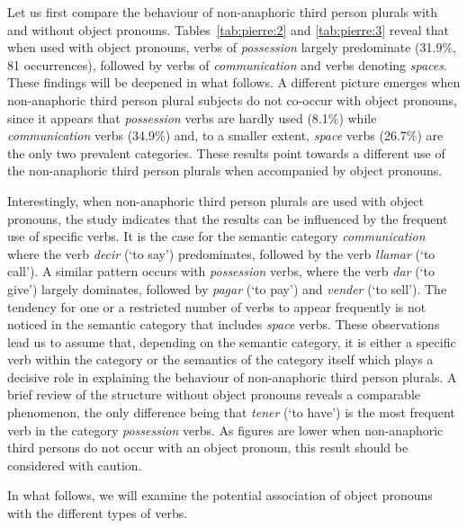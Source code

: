 \documentclass[output=paper]{langscibook}
\begin{document}
Let us first compare the behaviour of non-anaphoric third person plurals with and without object pronouns. Tables~\ref{tab:pierre:2} and \ref{tab:pierre:3} reveal that when used with object pronouns, verbs of \textit{possession} largely predominate (31.9\%, 81 occurrences), followed by verbs of \textit{communication} and verbs denoting \textit{spaces}. These findings will be deepened in what follows. A different picture emerges when non-anaphoric third person plural subjects do not co-occur with object pronouns, since it appears that \textit{possession} verbs are hardly used (8.1\%) while \textit{communication} verbs (34.9\%) and, to a smaller extent, \textit{space} verbs (26.7\%) are the only two prevalent categories. These results point towards a different use of the non-anaphoric third person plurals when accompanied by object pronouns.


Interestingly, when non-anaphoric third person plurals are used with object pronouns, the study indicates that the results can be influenced by the frequent use of specific verbs. It is the case for the semantic category \textit{communication} where the verb \textit{decir} (‘to say’) predominates, followed by the verb \textit{llamar} (‘to call’). A similar pattern occurs with \textit{possession} verbs, where the verb \textit{dar} (‘to give’) largely dominates, followed by \textit{pagar} (‘to pay’) and \textit{vender} (‘to sell’). The tendency for one or a restricted number of verbs to appear frequently is not noticed in the semantic category that includes \textit{space} verbs. These observations lead us to assume that, depending on the semantic category, it is either a specific verb within the category or the semantics of the category itself which plays a decisive role in explaining the behaviour of non-anaphoric third person plurals. A brief review of the structure without object pronouns reveals a comparable phenomenon, the only difference being that \textit{tener} (‘to have’) is the most frequent verb in the category \textit{possession} verbs. As figures are lower when non-anaphoric third persons do not occur with an object pronoun, this result should be considered with caution. 


In what follows, we will examine the potential association of object pronouns with the different types of verbs.
\end{document}
